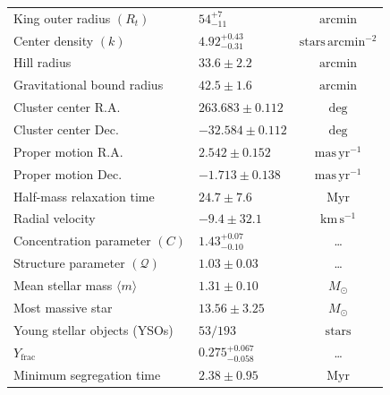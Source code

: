 \documentclass{aa}
\begin{document}
\begin{table}[!tbp]
{\begin{tabular}{llc}
			King outer radius $(R_t)$               & $54^{+7}_{-11}$ & $\mathrm{arcmin}$                  \\
			Center density $(k)$                    & $4.92^{+0.43}_{-0.31}$   & $\mathrm{stars\,arcmin^{-2}}$      \\
			Hill radius                             & $33.6 \pm 2.2$            & $\mathrm{arcmin}$                  \\
			Gravitational bound radius              & $42.5 \pm 1.6$            & $\mathrm{arcmin}$                  \\
			Cluster center R.A.                     & $263.683 \pm 0.112$ & $\mathrm{deg}$                     \\
			Cluster center Dec.                     & $-32.584 \pm 0.112$ & $\mathrm{deg}$                     \\
			Proper motion R.A.                      & $2.542 \pm 0.152$  & $\mathrm{mas\,yr^{-1}}$            \\
			Proper motion Dec.                      & $-1.713 \pm 0.138$ & $\mathrm{mas\,yr^{-1}}$            \\
			Half-mass relaxation time               & $24.7 \pm 7.6$             & $\mathrm{Myr}$                     \\
			Radial velocity                         & $-9.4 \pm 32.1$  & $\mathrm{km\,s^{-1}}$              \\
			Concentration parameter $(C)$           & $1.43^{+0.07}_{-0.10}$    & \ldots                             \\
			Structure parameter $(\mathcal{Q})$     & $1.03 \pm 0.03$    & \ldots                             \\
			Mean stellar mass $\langle m \rangle$   & $1.31 \pm 0.10$    & $M_\odot$                          \\
			Most massive star                       & $13.56 \pm 3.25$   & $M_\odot$                          \\
			Young stellar objects (YSOs)            & $53/193$            & $\mathrm{stars}$                   \\
			$Y_{\text{frac}}$                       & $0.275^{+0.067}_{-0.058}$          & \ldots                             \\
			Minimum segregation time                & $2.38 \pm 0.95$             & $\mathrm{Myr}$                     \\ \hline
		\end{tabular}%
	}

\end{table}
\end{document}
